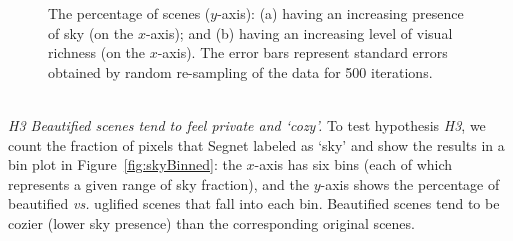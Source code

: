 \begin{figure}[!t]
    \centering
    \hspace*{-5mm}
    \vspace{-0.4cm}
    \label{fig:bin_figures}
    \caption{The percentage of scenes ($y$-axis): (a) having an increasing presence of sky (on the $x$-axis); and (b) having an increasing level of visual richness  (on the $x$-axis). The error bars represent standard errors obtained by random re-sampling of the data for 500 iterations. }
    \vspace{-0.4cm}
\end{figure}



\mbox{ } \\
\noindent
\emph{H3 Beautified scenes tend to feel private and `cozy'.}
To  test hypothesis \emph{H3}, we count the fraction of pixels that Segnet labeled  as `sky' and show the results in a bin plot in Figure~\ref{fig:skyBinned}:  the $x$-axis has six bins (each of which represents a given range of sky fraction), and the $y$-axis shows the percentage of beautified \emph{vs.} uglified scenes that fall into each bin.  Beautified scenes tend to be cozier (lower sky presence) than the corresponding original scenes.


